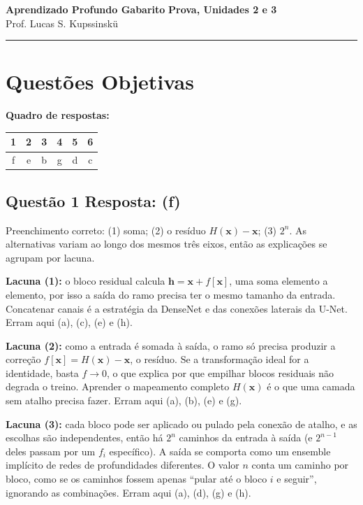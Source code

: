 \documentclass[11pt,a4paper]{article}
\begin{document}
{\Large\bfseries Aprendizado Profundo \textemdash{} Gabarito} \hfill \textbf{Prova, Unidades 2 e 3}\\
Prof. Lucas S. Kupssinskü

\rule{\linewidth}{0.8pt}

\section*{Questões Objetivas}

\textbf{Quadro de respostas:}
\begin{center}
\begin{tabular}{|c|c|c|c|c|c|}
\hline
1 & 2 & 3 & 4 & 5 & 6 \\\hline
f & e & b & g & d & c \\\hline
\end{tabular}
\end{center}

\color{blue}

\subsection*{Questão 1 \textemdash{} Resposta: (f)}
Preenchimento correto: (1) soma; (2) o resíduo $H(\mathbf{x}) - \mathbf{x}$; (3) $2^n$. As alternativas variam ao longo dos mesmos três eixos, então as explicações se agrupam por lacuna.

\textbf{Lacuna (1):} o bloco residual calcula $\mathbf{h} = \mathbf{x} + f[\mathbf{x}]$, uma soma elemento a elemento, por isso a saída do ramo precisa ter o mesmo tamanho da entrada. Concatenar canais é a estratégia da DenseNet e das conexões laterais da U-Net. Erram aqui (a), (c), (e) e (h).

\textbf{Lacuna (2):} como a entrada é somada à saída, o ramo só precisa produzir a correção $f[\mathbf{x}] = H(\mathbf{x}) - \mathbf{x}$, o resíduo. Se a transformação ideal for a identidade, basta $f \to 0$, o que explica por que empilhar blocos residuais não degrada o treino. Aprender o mapeamento completo $H(\mathbf{x})$ é o que uma camada sem atalho precisa fazer. Erram aqui (a), (b), (e) e (g).

\textbf{Lacuna (3):} cada bloco pode ser aplicado ou pulado pela conexão de atalho, e as escolhas são independentes, então há $2^n$ caminhos da entrada à saída (e $2^{n-1}$ deles passam por um $f_i$ específico). A saída se comporta como um ensemble implícito de redes de profundidades diferentes. O valor $n$ conta um caminho por bloco, como se os caminhos fossem apenas ``pular até o bloco $i$ e seguir'', ignorando as combinações. Erram aqui (a), (d), (g) e (h).
\end{document}
